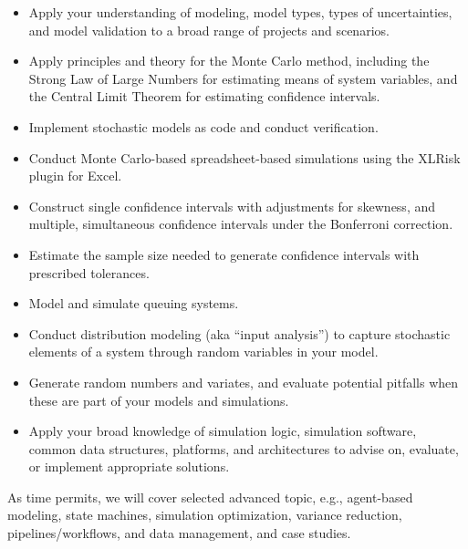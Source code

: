 \documentclass[11pt, a4paper]{article}
\begin{document}
\begin{itemize}
\item Apply your understanding of modeling, model types, types of uncertainties, and model validation to a broad range of projects and scenarios.
\item Apply principles and theory for the Monte Carlo method, including the Strong Law of Large Numbers for estimating means of system variables, and the Central Limit Theorem for estimating confidence intervals. %
\item Implement stochastic models as code and conduct verification. %
\item Conduct Monte Carlo-based spreadsheet-based simulations using the XLRisk plugin for Excel. 
\item Construct single confidence intervals with adjustments for skewness, and multiple, simultaneous confidence intervals under the Bonferroni correction. %
\item Estimate the sample size needed to generate confidence intervals with prescribed tolerances.
\item Model and simulate queuing systems.
\item Conduct distribution modeling (aka ``input analysis'') to capture stochastic elements of a system through random variables in your model. %
\item Generate random numbers and variates, and evaluate potential pitfalls when these are part of your models and simulations.
\item Apply your broad knowledge of simulation logic, simulation software, common data structures, platforms, and architectures to advise on, evaluate, or implement appropriate solutions.
\end{itemize}
As time permits, we will cover selected advanced topic, e.g., agent-based modeling, state machines, simulation optimization, variance reduction, pipelines/workflows, and data management, and case studies. 
\end{document}
